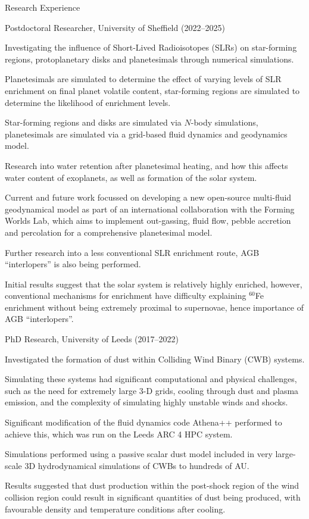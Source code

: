 \documentclass{resume} %
\begin{document}
\begin{rSection}{Research Experience}
	
	\begin{rPoints}{Postdoctoral Researcher, University of Sheffield (2022--2025)}
		\item Investigating the influence of Short-Lived Radioisotopes (SLRs) on star-forming regions, protoplanetary disks and planetesimals through numerical simulations.
		\item Planetesimals are simulated to determine the effect of varying levels of SLR enrichment on final planet volatile content, star-forming regions are simulated to determine the likelihood of enrichment levels.
		\item Star-forming regions and disks are simulated via $N$-body simulations, planetesimals are simulated via a grid-based fluid dynamics and geodynamics model.
		\item Research into water retention after planetesimal heating, and how this affects water content of exoplanets, as well as formation of the solar system.
		\item Current and future work focussed on developing a new open-source multi-fluid geodynamical model as part of an international collaboration with the Forming Worlds Lab, which aims to implement out-gassing, fluid flow, pebble accretion and percolation for a comprehensive planetesimal model. 
		\item Further research into a less conventional SLR enrichment route, AGB ``interlopers'' is also being performed.
		\item Initial results suggest that the solar system is relatively highly enriched, however, conventional mechanisms for enrichment have difficulty explaining $^{60}$Fe enrichment without being extremely proximal to supernovae, hence importance of AGB ``interlopers''. 
	\end{rPoints}
	\begin{rPoints}{PhD Research, University of Leeds (2017--2022)}
		\item Investigated the formation of dust within Colliding Wind Binary (CWB) systems.
		\item Simulating these systems had significant computational and physical challenges, such as the need for extremely large 3-D grids, cooling through dust and plasma emission, and the complexity of simulating highly unstable winds and shocks.
		\item Significant modification of the fluid dynamics code Athena++ performed to achieve this, which was run on the Leeds ARC 4 HPC system.
		\item Simulations performed using a passive scalar dust model included in very large-scale 3D hydrodynamical simulations of CWBs to hundreds of AU.
		\item Results suggested that dust production within the post-shock region of the wind collision region could result in significant quantities of dust being produced, with favourable density and temperature conditions after cooling.
	\end{rPoints}
\end{rSection}
\end{document}

